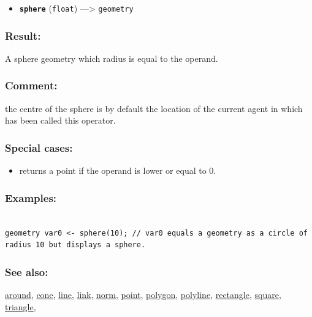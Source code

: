 \documentclass[]{book}
\providecommand{\tightlist}{%
  \setlength{\itemsep}{0pt}\setlength{\parskip}{0pt}}
\theoremstyle{definition}
\theoremstyle{definition}
\theoremstyle{definition}
\theoremstyle{remark}
\begin{document}
\begin{itemize}
\tightlist
\item
  \textbf{\texttt{sphere}} (\texttt{float}) ---\textgreater{}
  \texttt{geometry}
\end{itemize}

\subsubsection{Result:}\label{result-474}

A sphere geometry which radius is equal to the operand.

\subsubsection{Comment:}\label{comment-90}

the centre of the sphere is by default the location of the current agent
in which has been called this operator.

\subsubsection{Special cases:}\label{special-cases-127}

\begin{itemize}
\tightlist
\item
  returns a point if the operand is lower or equal to 0.
\end{itemize}

\subsubsection{Examples:}\label{examples-342}

\begin{verbatim}
 
geometry var0 <- sphere(10); // var0 equals a geometry as a circle of radius 10 but displays a sphere.
\end{verbatim}

\subsubsection{See also:}\label{see-also-191}

\href{operators-a-to-a.html\#around}{around},
\href{operators-b-to-c.html\#cone}{cone},
\href{operators-i-to-m.html\#line}{line},
\href{operators-i-to-m.html\#link}{link},
\href{operators-n-to-r.html\#norm}{norm},
\href{operators-n-to-r.html\#point}{point},
\href{operators-n-to-r.html\#polygon}{polygon},
\href{operators-n-to-r.html\#polyline}{polyline},
\href{operators-n-to-r.html\#rectangle}{rectangle},
\href{operators-s-to-z.html\#square}{square},
\href{operators-s-to-z.html\#triangle}{triangle},
\end{document}
